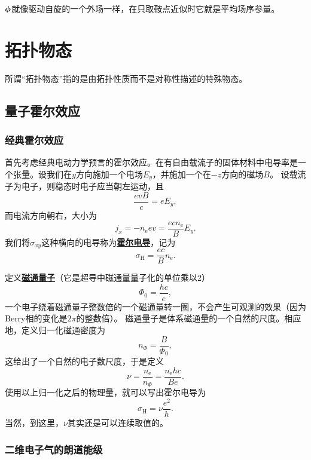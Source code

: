 \documentclass[hyperref, UTF8, a4paper]{ctexart}
\newcommand*{\concept}[1]{\underline{\textbf{#1}}}
\begin{document}
$\vb*{\phi}$就像驱动自旋的一个外场一样，在只取鞍点近似时它就是平均场序参量。

\section{拓扑物态}

所谓“拓扑物态”指的是由拓扑性质而不是对称性描述的特殊物态。

\subsection{量子霍尔效应}

\subsubsection{经典霍尔效应}

首先考虑经典电动力学预言的霍尔效应。在有自由载流子的固体材料中电导率是一个张量。设我们在$y$方向施加一个电场$E_y$，并施加一个在$-z$方向的磁场$B$。
设载流子为电子，则稳态时电子应当朝左运动，且
\[
    \frac{e v B}{c} = e E_y,
\]
而电流方向朝右，大小为
\[
    j_x = - n_\text{e} e v = \frac{e c n_\text{e}}{B} E_y.
\]
我们将$\sigma_{xy}$这种横向的电导称为\concept{霍尔电导}，记为
\begin{equation}
    \sigma_\text{H} = \frac{ec}{B} n_\text{e}.
\end{equation}

定义\concept{磁通量子}（它是超导中磁通量量子化的单位乘以2）
\begin{equation}
    \Phi_0 = \frac{h c}{e},
\end{equation}
一个电子绕着磁通量子整数倍的一个磁通量转一圈，不会产生可观测的效果（因为Berry相的变化是$2\pi$的整数倍）。
磁通量子是体系磁通量的一个自然的尺度。相应地，定义归一化磁通密度为
\begin{equation}
    n_{\Phi} = \frac{B}{\Phi_0},
\end{equation}
这给出了一个自然的电子数尺度，于是定义
\begin{equation}
    \nu = \frac{n_\text{e}}{n_\Phi} = \frac{n_\text{e} h c}{B e}.
\end{equation}
使用以上归一化之后的物理量，就可以写出霍尔电导为
\begin{equation}
    \sigma_\text{H} = \nu \frac{e^2}{h}.
\end{equation}
当然，到这里，$\nu$其实还是可以连续取值的。

\subsubsection{二维电子气的朗道能级}
\end{document}
